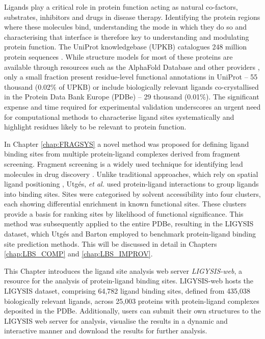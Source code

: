 Ligands play a critical role in protein function acting as natural co-factors, substrates, inhibitors and drugs in disease therapy. Identifying the protein regions where these molecules bind, understanding the mode in which they do so and characterising that interface is therefore key to understanding and modulating protein function. The UniProt knowledgebase (UPKB) catalogues 248 million protein sequences \cite{UNIPROT_2018_UNIPROT, UNIPROT_2023_UNIPROT}. While structure models for most of these proteins are available through resources such as the AlphaFold Database \cite{JUMPER_2021_ALPHAFOLD, VARADI_2022_ALPHAFOLDDB, ABRAMSON_2024_ALPHAFOLD3} and other providers \cite{GUEX_2009_SWISSMODEL, BEIENERT_2016_SWISSMODEL, WATERHOUSE_2018_SWISSMODEL}, only a small fraction present residue-level functional annotations in UniProt – 55 thousand (0.02\% of UPKB) or include biologically relevant ligands co-crystallised in the Protein Data Bank Europe (PDBe) \cite{BERMAN_2003_PDB, wwPDB_2019_PDB, ARMSTRONG_2020_PDBE} – 29 thousand (0.01\%). The significant expense and time required for experimental validation underscores an urgent need for computational methods to characterise ligand sites  systematically and highlight residues likely to be relevant to protein function.

In Chapter \ref{chap:FRAGSYS} a novel method was proposed for defining ligand binding sites from multiple protein-ligand complexes derived from fragment screening. Fragment screening is a widely used technique for identifying lead molecules in drug discovery \cite{CONGREVE_2003_RO3, REES_2004_FBLD, MURRAY_2009_FBDD}. Unlike traditional approaches, which rely on spatial ligand positioning \cite{SHIN_2005_PDBLIGAND, KOZAKOV_2005_CLUSTERING, WASS_2010_3DLIGANDSITE, MCGREIG_2022_3DLIGANDSITE}, Utgés, \textit{et al.} \cite{UTGES_2024_FRAGSYS} used protein-ligand interactions to group ligands into binding sites. Sites were categorised by solvent accessibility into four clusters, each showing differential enrichment in known functional sites. These clusters provide a basis for ranking sites by likelihood of functional significance. This method was subsequently applied to the entire PDBe, resulting in the LIGYSIS dataset, which Utgés and Barton \cite{UTGES_2024_LBSCOMP} employed to benchmark protein-ligand binding site prediction methods. This will be discussed in detail in Chapters \ref{chap:LBS_COMP} and \ref{chap:LBS_IMPROV}.

This Chapter introduces the ligand site analysis web server \textit{LIGYSIS-web}, a resource for the analysis of protein-ligand binding sites. LIGYSIS-web hosts the LIGYSIS dataset, comprising 64,782 ligand binding sites, defined from 435,038 biologically relevant ligands, across 25,003 proteins with protein-ligand complexes deposited in the PDBe. Additionally, users can submit their own structures to the LIGYSIS web server for analysis, visualise the results in a dynamic and interactive manner and download the results for further analysis.


